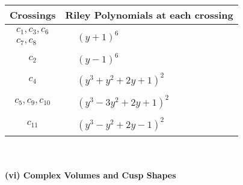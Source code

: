 \documentclass[1p]{elsarticle_modified}
\theoremstyle{definition}
\begin{document}
\begin{tabular}{m{50pt}|m{274pt}}
Crossings & \hspace{64pt}Riley Polynomials at each crossing \\
\hline $$\begin{aligned}c_{1},c_{3},c_{6}\\c_{7},c_{8}\end{aligned}$$&$\begin{aligned}
&(y+1)^6
\end{aligned}$\\
\hline $$\begin{aligned}c_{2}\end{aligned}$$&$\begin{aligned}
&(y-1)^6
\end{aligned}$\\
\hline $$\begin{aligned}c_{4}\end{aligned}$$&$\begin{aligned}
&(y^3+y^2+2 y+1)^2
\end{aligned}$\\
\hline $$\begin{aligned}c_{5},c_{9},c_{10}\end{aligned}$$&$\begin{aligned}
&(y^3-3 y^2+2 y+1)^2
\end{aligned}$\\
\hline $$\begin{aligned}c_{11}\end{aligned}$$&$\begin{aligned}
&(y^3- y^2+2 y-1)^2
\end{aligned}$\\
\hline
\end{tabular}\\~\\
\newpage\flushleft \textbf{(vi) Complex Volumes and Cusp Shapes}
\end{document}
